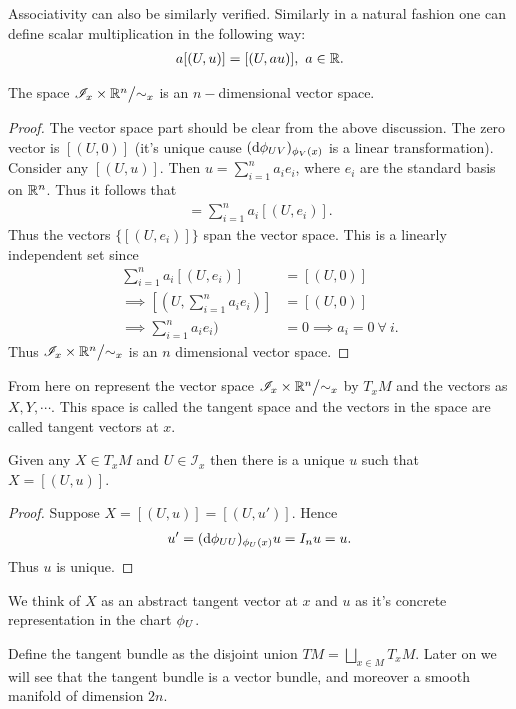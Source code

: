 Associativity can also be similarly verified. Similarly in a natural fashion one can define scalar multiplication in the following way:
\begin{align*}
  a[(U, u)] = [(U, au)],\ a\in \mathbb{R}.
\end{align*}
\begin{proposition}
  The space $ \mathscr{I}_x \times \R^n\bign/\sim_x$ is an $n-$dimensional vector space.
\end{proposition}
\begin{proof}
  The vector space part should be clear from the above discussion. The zero vector is $[(U, 0)]$ (it's unique cause $(\dd \phi_{UV})_{\phi_V(x)}$ is a linear transformation). Consider any $[(U, u)]$. Then $u = \sum_{i=1}^n a_i e_i$, where $e_i$ are the standard basis on $\mathbb{R}^n$. Thus it follows that
  \begin{align*}
    [(U, u)] = \sum_{i=1}^n a_i [(U, e_i)].
  \end{align*}
  Thus the vectors $\{[(U, e_i)]\}$ span the vector space. This is a linearly independent set since
  \begin{align*}
    \sum_{i=1}^n a_i [(U, e_i)] &= [(U, 0)]\\
    \implies [(U,\sum_{i=1}^n a_ie_i)] &= [(U,0)]\\
    \implies \sum_{i=1}^n a_ie_i) &= 0 \implies a_i = 0\ \forall\ i.
  \end{align*}
  Thus $ \mathscr{I}_x \times \R^n \bign/ \sim_x$ is an $n$ dimensional vector space.
\end{proof}
\begin{notation}
  From here on represent the vector space $\mathscr{I}_x \times \R^n \bign/ \sim_x$ by $T_xM$ and the vectors as $X,Y,\cdots$. This space is called the tangent space and the vectors in the space are called tangent vectors at $x$. 
\end{notation}
\begin{proposition}
  Given any $X\in T_xM$ and $U \in \mathscr{I}_x$ then there is a unique $u$ such that $X = [(U,u)]$.
\end{proposition}
\begin{proof}
  Suppose $X = [(U,u)] = [(U, u')]$. Hence
  \begin{align*}
    u' = (\dd \phi_{UU})_{\phi_U(x)} u = I_n u = u.
  \end{align*}
  Thus $u$ is unique.
\end{proof}
\begin{remark}
  We think of $X$ as an abstract tangent vector at $x$ and $u$ as it's concrete representation in the chart $\phi_U$.
\end{remark}
\begin{definition}
  Define the tangent bundle as the disjoint union $TM = \bigsqcup_{x\in M} T_xM$. Later on we will see that the tangent bundle is a vector bundle, and moreover a smooth manifold of dimension $2n$.
\end{definition}
